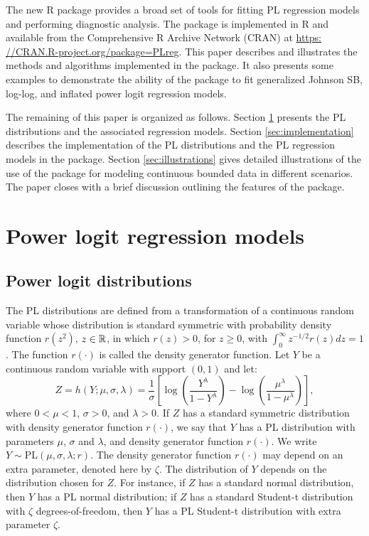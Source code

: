 The new R package  provides a broad set of tools for fitting PL regression models and performing diagnostic analysis. The package is implemented in R and available from the Comprehensive R Archive Network (CRAN) at \url{https:
//CRAN.R-project.org/package=PLreg}. This paper describes and illustrates the methods and algorithms implemented in the package. It also presents some examples to demonstrate the ability of the package to fit generalized Johnson SB, log-log, and inflated power logit regression models.

The remaining of this paper is organized as follows. Section \ref{PLmodel} presents the PL distributions and the associated regression models. Section \ref{sec:implementation} describes the implementation of the PL distributions and the PL regression models in the  package. Section \ref{sec:illustrations} gives detailed illustrations of the use of the  package for modeling continuous bounded data in different scenarios. The paper closes with a brief discussion outlining the features of the  package.

\section{Power logit regression models}\label{PLmodel}

\subsection{Power logit distributions}
The PL distributions \citep{QueirozFerrari2023} are defined from a transformation of a continuous random variable whose distribution is standard symmetric with probability density function $r(z^2)$, $z\in \mathbb{R}$, in which $r(z)>0$, for $z \geq 0$, with $\int_0^\infty z^{-1/2} r(z) dz=1$. The function $r(\cdot)$ is called the density generator function. Let $Y$ be a continuous random variable with support $(0,1)$ and let:
%
\begin{equation*}
Z = h(Y; \mu, \sigma, \lambda) = \dfrac{1}{\sigma} \left[ \log \left( \dfrac{Y^\lambda}{1-Y^\lambda} \right) - \log \left( \dfrac{\mu^\lambda}{1-\mu^\lambda} \right)\right],
\end{equation*}
%
where $0< \mu<1$, $\sigma>0$, and $\lambda>0$. If $Z$ has a standard symmetric distribution with density generator function $r(\cdot)$, we say that $Y$ has a PL distribution with parameters $\mu$, $\sigma$ and $\lambda$, and density generator function $r(\cdot)$. We write $Y \sim \mbox{PL} (\mu, \sigma, \lambda; r)$.  The density generator function $r(\cdot)$ may depend on an extra parameter, denoted here by $\zeta$. The distribution of $Y$ depends on the distribution chosen for $Z$. For instance, if $Z$ has a standard normal distribution, then $Y$ has a PL normal distribution; if $Z$ has a standard Student-t distribution with $\zeta$ degrees-of-freedom, then $Y$ has a PL Student-t distribution with extra parameter $\zeta$. 

